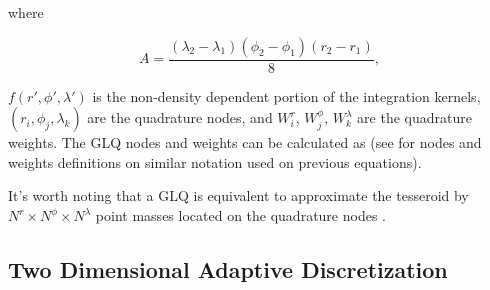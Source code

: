 \documentclass[extra, referee]{gji}
\begin{document}

\noindent where

\begin{equation}
    A =
    \frac{(\lambda_2 - \lambda_1)(\phi_2 - \phi_1)(r_2 - r_1)}{8},
\end{equation}

\noindent $f(r', \phi', \lambda')$ is the non-density dependent portion of the
integration kernels, $(r_i, \phi_j, \lambda_k)$ are the quadrature nodes, and
$W_i^r$, $W_j^\phi$, $W_k^\lambda$ are the quadrature weights.
The GLQ nodes and weights can be calculated as \citet[p.~391]{Hildebrand1987} (see
\citet{Uieda2016} for nodes and weights definitions on similar notation used on previous
equations).

It's worth noting that a GLQ is equivalent to approximate the tesseroid by $N^r \times
N^\phi \times N^\lambda$ point masses located on the quadrature nodes
\citep{Ku1977, Li2011, Uieda2016}.


\subsection{Two Dimensional Adaptive Discretization}
\end{document}
